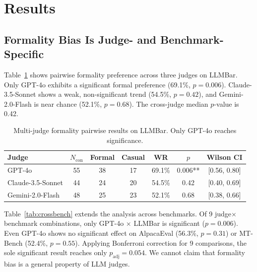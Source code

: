\documentclass[11pt,a4paper]{article}
\begin{document}
\section{Results}

\subsection{Formality Bias Is Judge- and Benchmark-Specific}
\label{sec:formality}

Table~\ref{tab:multijudge} shows pairwise formality preference across three judges on LLMBar. Only GPT-4o exhibits a significant formal preference (69.1\%, $p=0.006$). Claude-3.5-Sonnet shows a weak, non-significant trend (54.5\%, $p=0.42$), and Gemini-2.0-Flash is near chance (52.1\%, $p=0.68$). The cross-judge median $p$-value is 0.42.

\begin{table}[t]
\centering
\small
\caption{Multi-judge formality pairwise results on LLMBar. Only GPT-4o reaches significance.}
\label{tab:multijudge}
\begin{tabular}{lcccccc}
\toprule
\textbf{Judge} & \textbf{$N_{\text{con}}$} & \textbf{Formal} & \textbf{Casual} & \textbf{WR} & \textbf{$p$} & \textbf{Wilson CI} \\
\midrule
GPT-4o & 55 & 38 & 17 & 69.1\% & 0.006** & [0.56, 0.80] \\
Claude-3.5-Sonnet & 44 & 24 & 20 & 54.5\% & 0.42 & [0.40, 0.69] \\
Gemini-2.0-Flash & 48 & 25 & 23 & 52.1\% & 0.68 & [0.38, 0.66] \\
\bottomrule
\end{tabular}
\end{table}

Table~\ref{tab:crossbench} extends the analysis across benchmarks. Of 9 judge$\times$benchmark combinations, only GPT-4o $\times$ LLMBar is significant ($p=0.006$). Even GPT-4o shows no significant effect on AlpacaEval (56.3\%, $p=0.31$) or MT-Bench (52.4\%, $p=0.55$). Applying Bonferroni correction for 9 comparisons, the sole significant result reaches only $p_{\text{adj}} = 0.054$. We cannot claim that formality bias is a general property of LLM judges.
\end{document}
